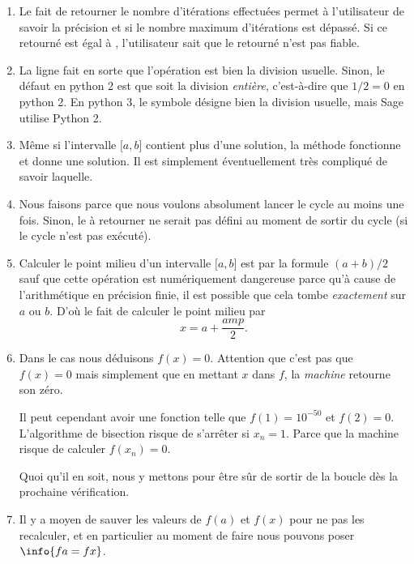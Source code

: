 \begin{enumerate}
	\item
	      Le fait de retourner le nombre d'itérations effectuées permet à l'utilisateur de savoir la précision et si le nombre maximum d'itérations est dépassé. Si ce  retourné est égal à , l'utilisateur sait que le  retourné n'est pas fiable.
	\item
	      La ligne  fait en sorte que l'opération \info{/} est bien la division usuelle. Sinon, le défaut en python 2 est que \info{/} soit la division \emph{entière}, c'est-à-dire que \( 1/2=0\) en python 2.
	      En python 3, le symbole \info{/} désigne bien la division usuelle, mais Sage utilise Python 2.
	\item
	      Même si l'intervalle \( \mathopen[ a , b \mathclose]\) contient plus d'une solution, la méthode fonctionne et donne une solution. Il est simplement éventuellement très compliqué de savoir laquelle.
	\item
	      Nous faisons  parce que nous voulons absolument lancer le cycle au moins une fois. Sinon, le  à retourner ne serait pas défini au moment de sortir du cycle (si le cycle n'est pas exécuté).
	\item
	      Calculer le point milieu d'un intervalle \( \mathopen[ a , b \mathclose]\) est par la formule \( (a+b)/2\) sauf que cette opération est numériquement dangereuse parce qu'à cause de l'arithmétique en précision finie, il est possible que cela tombe \emph{exactement} sur \( a\) ou \( b\). D'où le fait de calculer le point milieu par
	      \begin{equation}
		      x=a+\frac{ amp }{2}.
	      \end{equation}
	\item
	      Dans le cas  nous déduisons \( f(x)=0\). Attention que c'est pas que \( f(x)=0\) mais simplement que en mettant \( x\) dans \( f\), la \emph{machine} retourne son zéro.

	      Il peut cependant avoir une fonction telle que \( f(1)=10^{-50}\) et \( f(2)=0\). L'algorithme de bisection risque de s'arrêter si \( x_n=1\). Parce que la machine risque de calculer \( f(x_n)=0\).

	      Quoi qu'il en soit, nous y mettons  pour être sûr de sortir de la boucle dès la prochaine vérification.
	\item
	      Il y a moyen de sauver les valeurs de \( f(a)\) et \( f(x)\) pour ne pas les recalculer, et en particulier au moment de faire  nous pouvons poser \(\info{fa=fx}\).
\end{enumerate}

